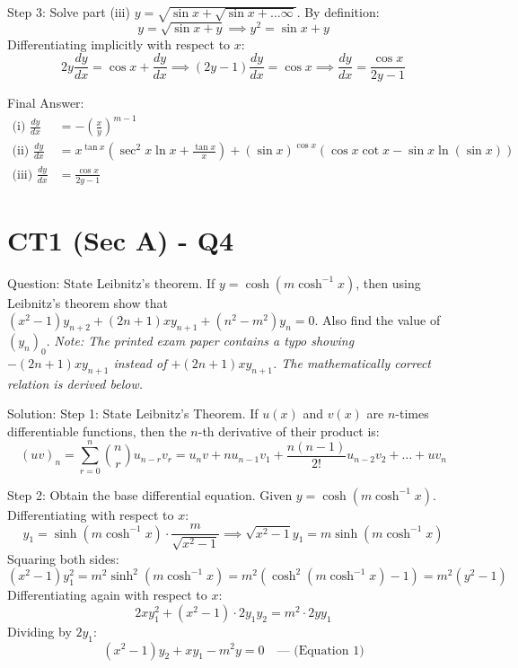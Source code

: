 \documentclass{article}
\begin{document}
Step 3: Solve part (iii) $y = \sqrt{\sin x + \sqrt{\sin x + \dots \infty}}$.
By definition:
\[
y = \sqrt{\sin x + y} \implies y^2 = \sin x + y
\]
Differentiating implicitly with respect to $x$:
\[
2y \frac{dy}{dx} = \cos x + \frac{dy}{dx} \implies (2y - 1) \frac{dy}{dx} = \cos x \implies \frac{dy}{dx} = \frac{\cos x}{2y - 1}
\]

Final Answer:
\begin{align*}
    \text{(i) } \frac{dy}{dx} &= -\left(\frac{x}{y}\right)^{m-1} \\
    \text{(ii) } \frac{dy}{dx} &= x^{\tan x} \left( \sec^2 x \ln x + \frac{\tan x}{x} \right) + (\sin x)^{\cos x} \left( \cos x \cot x - \sin x \ln(\sin x) \right) \\
    \text{(iii) } \frac{dy}{dx} &= \frac{\cos x}{2y - 1}
\end{align*}

\section*{CT1 (Sec A) - Q4}
Question:
State Leibnitz's theorem. If $y = \cosh(m \cosh^{-1} x)$, then using Leibnitz's theorem show that $(x^2 - 1)y_{n+2} + (2n+1)xy_{n+1} + (n^2 - m^2)y_n = 0$. Also find the value of $(y_n)_0$.
\newline
\textit{Note: The printed exam paper contains a typo showing $- (2n+1)xy_{n+1}$ instead of $+ (2n+1)xy_{n+1}$. The mathematically correct relation is derived below.}

Solution:
Step 1: State Leibnitz's Theorem.
If $u(x)$ and $v(x)$ are $n$-times differentiable functions, then the $n$-th derivative of their product is:
\[
(uv)_n = \sum_{r=0}^n \binom{n}{r} u_{n-r} v_r = u_n v + n u_{n-1} v_1 + \frac{n(n-1)}{2!} u_{n-2} v_2 + \dots + u v_n
\]

Step 2: Obtain the base differential equation.
Given $y = \cosh(m \cosh^{-1} x)$. Differentiating with respect to $x$:
\[
y_1 = \sinh(m \cosh^{-1} x) \cdot \frac{m}{\sqrt{x^2 - 1}} \implies \sqrt{x^2 - 1} y_1 = m \sinh(m \cosh^{-1} x)
\]
Squaring both sides:
\[
(x^2 - 1)y_1^2 = m^2 \sinh^2(m \cosh^{-1} x) = m^2 \left( \cosh^2(m \cosh^{-1} x) - 1 \right) = m^2 (y^2 - 1)
\]
Differentiating again with respect to $x$:
\[
2x y_1^2 + (x^2 - 1) \cdot 2 y_1 y_2 = m^2 \cdot 2 y y_1
\]
Dividing by $2y_1$:
\[
(x^2 - 1)y_2 + x y_1 - m^2 y = 0 \quad \text{--- (Equation 1)}
\]
\end{document}
